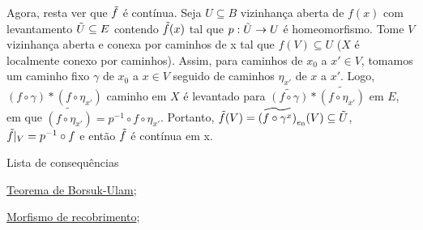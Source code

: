 \begin{dem}
    Agora, resta ver que $\Tilde{f}$ é contínua. Seja $U \subseteq B$ vizinhança aberta de $f(x)$ com levantamento $\Tilde{U} \subseteq E$ contendo $\Tilde{f}(x)$ tal que $p: \Tilde{U} \rightarrow U$ é homeomorfismo. Tome $V$ vizinhança aberta e conexa por caminhos de x tal que $f(V) \subseteq U$ ($X$ é localmente conexo por caminhos). Assim, para caminhos de $x_0$ a $x' \in V$, tomamos um caminho fixo $\gamma$ de $x_0$ a $x \in V$ seguido de caminhos $\eta_{x'}$ de $x$ a $x'$. Logo, $(f \circ \gamma) \ast (f \circ \eta_{x'})$ caminho em $X$ é levantado para $\widetilde{(f \circ \gamma)} \ast \widetilde{(f \circ \eta_{x'})}$ em $E$, em que $\widetilde{(f \circ \eta_{x'})} = p^{-1} \circ f \circ  \eta_{x'}$. Portanto, $\Tilde{f}(V) = \widetilde{(f \circ \gamma^{x})}_{e_0} (V) \subseteq \Tilde{U}$, $\Tilde{f}|_V = p^{-1} \circ f$ e então $\Tilde{f}$ é contínua em x.
     
\end{dem}
\begin{titlemize}{Lista de consequências}
	\item \hyperref[teo-borsuk-ulam-prop]{Teorema de Borsuk-Ulam};\\ %
 	\item \hyperref[morfismo-de-recobrimento-def]{Morfismo de recobrimento};
\end{titlemize}

